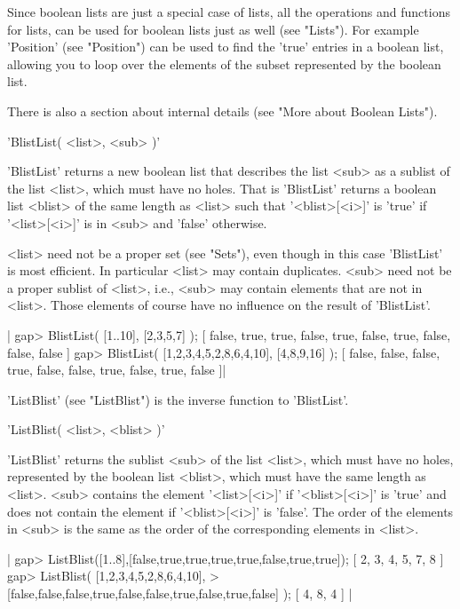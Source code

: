 Since boolean lists are just a special case  of lists, all the operations
and functions for lists, can be used for boolean  lists just as well (see
"Lists").  For  example 'Position' (see  "Position") can be used  to find
the  'true'  entries in  a  boolean list, allowing   you to loop over the
elements of the subset represented by the boolean list.

There is also a section  about internal details  (see "More about Boolean
Lists").


'BlistList( <list>, <sub> )'

'BlistList' returns a new boolean list that describes the list <sub> as a
sublist of  the  list <list>,   which  must  have  no holes.   That    is
'BlistList' returns  a boolean list <blist> of  the same length as <list>
such  that '<blist>[<i>]'  is 'true' if  '<list>[<i>]'   is in <sub>  and
'false' otherwise.

<list>  need not be a proper  set (see "Sets"),  even though in this case
'BlistList' is most     efficient.   In particular  <list> may    contain
duplicates.   <sub> need not  be a proper  sublist of <list>, i.e., <sub>
may contain  elements that are  not in <list>.   Those elements of course
have no influence on the result of 'BlistList'.

|    gap> BlistList( [1..10], [2,3,5,7] );
    [ false, true, true, false, true, false, true, false, false, false ]
    gap> BlistList( [1,2,3,4,5,2,8,6,4,10], [4,8,9,16] );
    [ false, false, false, true, false, false, true, false, true, false ]|

'ListBlist' (see "ListBlist") is the inverse function to 'BlistList'.


'ListBlist( <list>, <blist> )'

'ListBlist' returns the sublist <sub> of the list <list>, which must have
no holes, represented  by the boolean  list <blist>, which  must have the
same length   as  <list>.   <sub> contains  the  element '<list>[<i>]' if
'<blist>[<i>]'     is  'true' and   does    not contain   the element  if
'<blist>[<i>]'  is 'false'.  The  order of  the elements  in <sub> is the
same as the order of the corresponding elements in <list>.

|    gap> ListBlist([1..8],[false,true,true,true,true,false,true,true]);
    [ 2, 3, 4, 5, 7, 8 ]
    gap> ListBlist( [1,2,3,4,5,2,8,6,4,10],
    > [false,false,false,true,false,false,true,false,true,false] );
    [ 4, 8, 4 ] |

